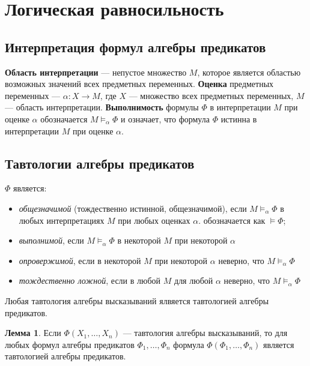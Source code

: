 \section{Логическая равносильность}
\subsection{Интерпретация формул алгебры предикатов}
\dftion \textbf{Область интерпретации} --- непустое множество $M$, которое является областью возможных значений всех предметных переменных.
\dftion \textbf{Оценка} предметных переменных --- $\alpha: X \to M$, где $X$ --- множество всех предметных переменных, $M$ --- область интерпретации.
\dftion \textbf{Выполнимость} формулы $\Phi$ в интерпретации $M$ при оценке $\alpha$ обозначается $M \vDash_\alpha \Phi$ и означает, что формула $\Phi$ истинна в интерпретации $M$ при оценке $\alpha$.
\subsection{Тавтологии алгебры предикатов}
\dftion  $\Phi$ является:
\begin{itemize}
    \item \textit{общезначимой} (тождественно истинной, общезначимой), если $M \vDash_\alpha \Phi$ в любых интерпретациях $M$ при любых оценках $\alpha$. обозначается как $\vDash \Phi$;
    \item \textit{выполнимой}, если $M \vDash_\alpha \Phi$ в некоторой $M$ при некоторой $\alpha$
    \item \textit{опровержимой}, если в некоторой $M$ при некоторой $\alpha$ неверно, что $M \vDash_\alpha \Phi$
    \item \textit{тождественно ложной}, если в любой $M$ для любой $\alpha$ неверно, что $M \vDash_\alpha \Phi$
\end{itemize}

Любая тавтология алгебры высказываний ялвяется тавтологией алгебры предикатов.

\textbf{Лемма 1}. Если $\Phi(X_1, \dots, X_n)$ --- тавтология алгебры высказываний, то для любых формул алгебры предикатов $\Phi_1, \dots, \Phi_n$ формула $\Phi(\Phi_1, \dots, \Phi_n)$ является тавтологией алгебры предикатов.

